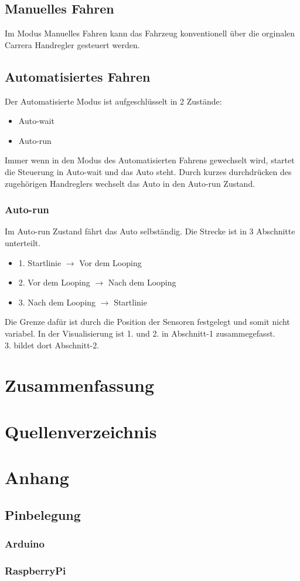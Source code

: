 \documentclass[a4paper, 11pt]{scrartcl}
\begin{document}
	\subsection{Manuelles Fahren}
		Im Modus Manuelles Fahren kann das Fahrzeug konventionell über die orginalen Carrera Handregler gesteuert 
		werden. 
	\subsection{Automatisiertes Fahren}
		Der Automatisierte Modus ist aufgeschlüsselt in 2 Zustände:
		\begin{itemize}
			\item Auto-wait
			\item Auto-run
		\end{itemize}
		Immer wenn in den Modus des Automatisierten Fahrens gewechselt wird, startet die Steuerung in 
		Auto-wait und das Auto steht.
		Durch kurzes durchdrücken des zugehörigen Handreglers wechselt das Auto in den Auto-run Zustand.
		\subsubsection{Auto-run}
			Im Auto-run Zustand fährt das Auto selbständig. Die Strecke ist in 3 Abschnitte unterteilt.
			\begin{itemize}
				\item{1.} Startlinie $\rightarrow$ Vor dem Looping
				\item{2.} Vor dem Looping $\rightarrow$ Nach dem Looping
				\item{3.} Nach dem Looping $\rightarrow$ Startlinie
			\end{itemize}
			Die Grenze dafür ist durch die Position der Sensoren festgelegt und somit nicht variabel.
			In der Visualisierung ist 1. und 2. in Abschnitt-1 zusammegefasst. \\3. bildet dort Abschnitt-2.
			\newpage
			
\newpage

\section{Zusammenfassung}
\newpage

\section{Quellenverzeichnis}
\newpage

\section{Anhang}
\subsection{Pinbelegung}
\subsubsection{Arduino}
\subsubsection{RaspberryPi}
\end{document}
